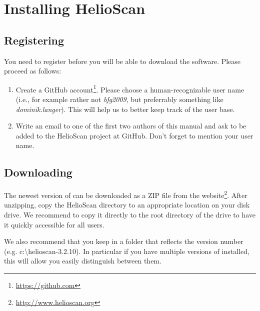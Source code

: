 \chapter{Installing HelioScan}

\section{Registering}

You need to register before you will be able to download the \HS software. Please proceed as follows:

\begin{enumerate}
	\item Create a GitHub account\footnote{\url{https://github.com}}. Please choose a human-recognizable user name (i.e., for example rather not \textit{bfg2009}, but preferrably something like \textit{dominik.langer}). This will help us to better keep track of the \HS user base.
	\item Write an email to one of the first two authors of this manual and ask to be added to the HelioScan project at GitHub. Don't forget to mention your user name.
\end{enumerate}

\section{Downloading}

The newest version of \HS can be downloaded as a ZIP file from the \HS website\footnote{\url{http://www.helioscan.org}}. After unzipping, copy the HelioScan directory to an appropriate location on your disk drive. We recommend to copy it directly to the root directory of the drive to have it quickly accessible for all users. 

We also recommend that you keep \HS in a folder that reflects the version number (e.g. c:\textbackslash helioscan-3.2.10). In particular if you have multiple versions of \HS installed, this will allow you easily distinguish between them.


